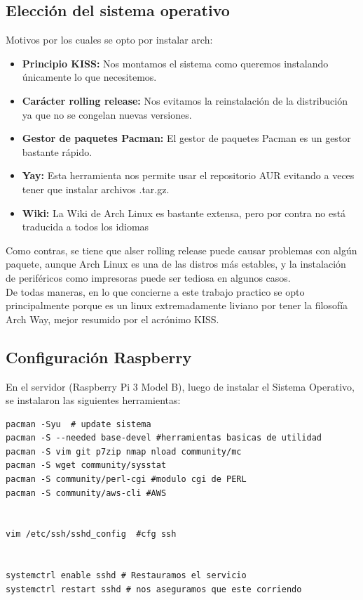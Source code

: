 \documentclass{article}
\begin{document}
\subsection{Elección del sistema operativo}
Motivos por los cuales se opto por instalar arch:
\begin{itemize}
\item \textbf{Principio KISS:} Nos montamos el sistema como queremos instalando únicamente lo que necesitemos.
\item \textbf{Carácter rolling release:} Nos evitamos la reinstalación de la distribución ya que no se congelan nuevas versiones.
\item \textbf{Gestor de paquetes Pacman:} El gestor de paquetes Pacman es un gestor bastante rápido.
\item \textbf{Yay:} Esta herramienta nos permite usar el repositorio AUR evitando a veces tener que instalar archivos .tar.gz.
\item \textbf{Wiki:} La Wiki de Arch Linux es bastante extensa, pero por contra no está traducida a todos los idiomas
\end{itemize}

Como contras, se tiene que alser rolling release puede causar problemas con algún paquete, aunque Arch Linux es una de las distros más estables, y
la instalación de periféricos como impresoras puede ser tediosa en algunos casos. \\

De todas maneras, en lo que concierne a este trabajo practico se opto principalmente porque es un linux extremadamente liviano por tener la filosofía
Arch Way, mejor resumido por el acrónimo KISS. \\

\subsection{Configuración Raspberry}

En el servidor (Raspberry Pi 3 Model B), luego de instalar el Sistema Operativo, se instalaron las siguientes herramientas:\\

\begin{lstlisting}[style=PerlStyle]
pacman -Syu  # update sistema
pacman -S --needed base-devel #herramientas basicas de utilidad
pacman -S vim git p7zip nmap nload community/mc
pacman -S wget community/sysstat 
pacman -S community/perl-cgi #modulo cgi de PERL
pacman -S community/aws-cli #AWS


vim /etc/ssh/sshd_config  #cfg ssh


systemctrl enable sshd # Restauramos el servicio 
systemctrl restart sshd # nos aseguramos que este corriendo

\end{lstlisting}
\end{document}

